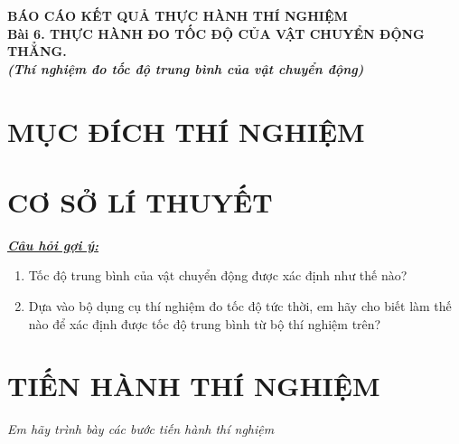 \begin{center}
	\textbf{BÁO CÁO KẾT QUẢ THỰC HÀNH THÍ NGHIỆM}\\
	\textbf{Bài 6. THỰC HÀNH ĐO TỐC ĐỘ CỦA VẬT CHUYỂN ĐỘNG THẲNG.}\\
	\textbf{\textit{(Thí nghiệm đo tốc độ trung bình của vật chuyển động)}}
\end{center}
\setcounter{section}{0}
\section{MỤC ĐÍCH THÍ NGHIỆM}
\Pointilles[2]
\section{CƠ SỞ LÍ THUYẾT}
\textit{\textbf{\underline{Câu hỏi gợi ý:}}}\\
\begin{enumerate}[label=\bfseries Câu \arabic*., leftmargin=2cm]
	\item Tốc độ trung bình của vật chuyển động được xác định như thế nào?
	\item Dựa vào bộ dụng cụ thí nghiệm đo tốc độ tức thời, em hãy cho biết làm thế nào để xác định được tốc độ trung bình từ bộ thí nghiệm trên?
\end{enumerate}
\Pointilles[19]
\section{TIẾN HÀNH THÍ NGHIỆM}
\textit{Em hãy trình bày các bước tiến hành thí nghiệm}\\
\Pointilles[20]
